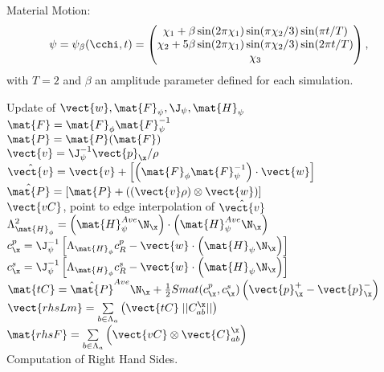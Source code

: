 Material Motion:
\begin{equation}
	\psi = \psi_\beta(\cchi,t) = 
	\begin{pmatrix}
		\chi_1 + \beta \sin(2\pi\chi_1) \sin(\pi\chi_2/3)\sin(\pi t/T) \\
		
		\chi_2 + 5\beta \sin(2\pi\chi_1) \sin(\pi\chi_2/3)\sin(2\pi t/T) \\
		
		\chi_3
	\end{pmatrix},
\end{equation}
with $T=2$ and $\beta$ an amplitude parameter defined for each simulation.


\begin{algorithm}[H]
	Update of $\vect{w}, \mat{F}_{\psi}, \J_{\psi}, \mat{H}_{\psi}$ \\
	$\mat{F} = \mat{F}_{\phi}\mat{F}_{\psi}^{-1}$ \\
	$\mat{P} = \mat{P}(\mat{F})$ \\
	$\vect{v} = \J_{\psi}^{-1} \vect{p}_{\x}/\rho$ \\
	$\hat{\vect{v}} = \vect{v} + \left[ \left( \mat{F}_{\phi}\mat{F}_{\psi}^{-1}\right)\cdot\vect{w} \right]$ \\
	$\hat{\mat{P}} = \left[ \mat{P} + \left( (\vect{v}\rho)\otimes \vect{w}   \right) \right]$ \\
	$\vect{vC}$, point to edge interpolation of $\hat{\vect{v}}$ \\
	$\Lambda_{\mat{H}_\phi}^2 = \left( \mat{H}_{\psi}^{Ave} \N_{\x} \right) \cdot \left( \mat{H}_{\psi}^{Ave} \N_{\x} \right)$ \\
	$c^{p}_{\x} = \J_{\psi}^{-1} \left[ \Lambda_{\mat{H}_\phi}c^{p}_{R} - \vect{w}\cdot\left( \mat{H}_{\psi}\N_{\x} \right) \right]$ \\
	$c^{s}_{\x} = \J_{\psi}^{-1} \left[ \Lambda_{\mat{H}_\phi}c^{s}_{R} - \vect{w}\cdot\left( \mat{H}_{\psi}\N_{\x} \right) \right]$  \\
	$\mat{tC} = \hat{\mat{P}}^{Ave} \N_{\x} + \frac{1}{2} Smat(c^{p}_{\x},c^{s}_{\x}) \left( \vect{p}_{\x}^{+}-\vect{p}_{\x}^{-}\right)$ \\
	$\vect{rhsLm} =  \sum\limits_{b\in\Lambda_a} \left( \vect{tC} \; ||C^{\x}_{ab}|| \right)$ \\
	$\mat{rhsF} =  \sum\limits_{b\in\Lambda_a} \left( \vect{vC} \otimes \vect{C}^{\x}_{ab} \right)$ \\
	\caption{Computation of Right Hand Sides.}
\end{algorithm}


